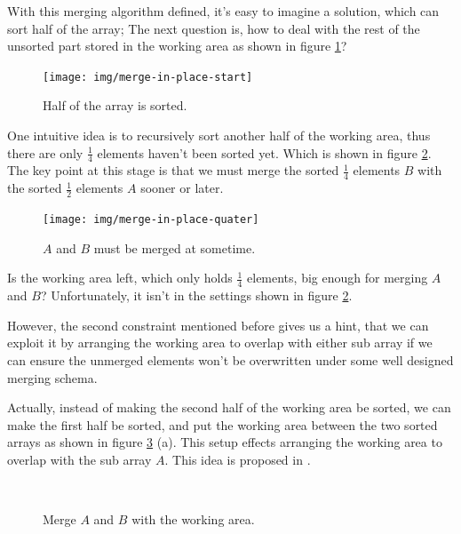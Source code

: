 \documentclass[b5paper]{article}
\begin{document}
With this merging algorithm defined, it's easy to imagine a solution, which can sort
half of the array; The next question is, how to deal with the rest of the unsorted part
stored in the working area as shown in figure \ref{fig:merge-in-place-start}?

\begin{figure}[htbp]
 \centering
 \texttt{[image: img/merge-in-place-start]}
 \caption{Half of the array is sorted.}
 \label{fig:merge-in-place-start}
\end{figure}

One intuitive idea is to recursively sort another half of the working area, thus there are
only $\frac{1}{4}$ elements haven't been sorted yet. Which is shown in figure \ref{fig:merge-in-place-quater}.
The key point at this stage is that we must merge the sorted $\frac{1}{4}$ elements $B$
with the sorted $\frac{1}{2}$ elements $A$ sooner or later.

\begin{figure}[htbp]
 \centering
 \texttt{[image: img/merge-in-place-quater]}
 \caption{$A$ and $B$ must be merged at sometime.}
 \label{fig:merge-in-place-quater}
\end{figure}

Is the working area left, which only holds $\frac{1}{4}$ elements, big enough for merging
$A$ and $B$? Unfortunately, it isn't in the settings shown in figure \ref{fig:merge-in-place-quater}.

However, the second constraint mentioned before gives us a hint, that we can exploit
it by arranging the working area to overlap with either sub array if we can ensure
the unmerged elements won't be overwritten under some well designed merging schema.

Actually, instead of making the second half of the working area be sorted, we can make the first
half be sorted, and put the working area between the two sorted arrays as shown in figure
\ref{fig:merge-in-place-setup} (a).
This setup effects arranging the working area to overlap with the sub array $A$. This idea
is proposed in \cite{msort-in-place}.

\begin{figure}[htbp]
 \centering
  \\
 \caption{Merge $A$ and $B$ with the working area.}
 \label{fig:merge-in-place-setup}
\end{figure}
\end{document}
